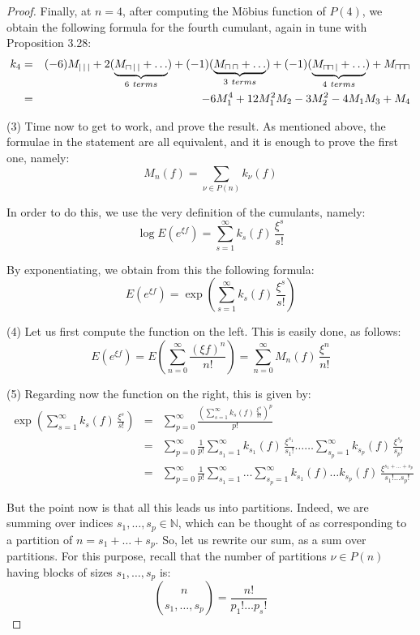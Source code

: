 \documentclass[12pt]{amsbook}
\begin{document}
\begin{proof}
Finally, at $n=4$, after computing the M\"obius function of $P(4)$, we obtain the following formula for the fourth cumulant, again in tune with Proposition 3.28:
\begin{eqnarray*}
k_4
&=&(-6)M_{|\,|\,|}+2(\underbrace{M_{\sqcap\,|\,|}+\ldots}_{6\ terms})+(-1)(\underbrace{M_{\sqcap\,\sqcap}+\ldots}_{3\ terms})+(-1)(\underbrace{M_{\sqcap\hskip-0.5mm\sqcap\,|}+\ldots}_{4\ terms})+M_{\sqcap\hskip-0.5mm\sqcap\hskip-0.5mm\sqcap}\\
&=&-6M_1^4+12M_1^2M_2-3M_2^2-4M_1M_3+M_4
\end{eqnarray*}

(3) Time now to get to work, and prove the result. As mentioned above, the formulae in the statement are all equivalent, and it is enough to prove the first one, namely:
$$M_n(f)=\sum_{\nu\in P(n)}k_\nu(f)$$

In order to do this, we use the very definition of the cumulants, namely:
$$\log E(e^{\xi f})=\sum_{s=1}^\infty k_s(f)\,\frac{\xi^s}{s!}$$

By exponentiating, we obtain from this the following formula:
$$E(e^{\xi f})=\exp\left(\sum_{s=1}^\infty k_s(f)\,\frac{\xi^s}{s!}\right)$$

(4) Let us first compute the function on the left. This is easily done, as follows:
$$E(e^{\xi f})
=E\left(\sum_{n=0}^\infty\frac{(\xi f)^n}{n!}\right)
=\sum_{n=0}^\infty M_n(f)\,\frac{\xi^n}{n!}$$

(5) Regarding now the function on the right, this is given by:
\begin{eqnarray*}
\exp\left(\sum_{s=1}^\infty k_s(f)\,\frac{\xi^s}{s!}\right)
&=&\sum_{p=0}^\infty\frac{\left(\sum_{s=1}^\infty k_s(f)\,\frac{\xi^s}{s!}\right)^p}{p!}\\
&=&\sum_{p=0}^\infty\frac{1}{p!}\sum_{s_1=1}^\infty k_{s_1}(f)\,\frac{\xi^{s_1}}{s_1!}\ldots\ldots\sum_{s_p=1}^\infty k_{s_p}(f)\,\frac{\xi^{s_p}}{s_p!}\\
&=&\sum_{p=0}^\infty\frac{1}{p!}\sum_{s_1=1}^\infty\ldots\sum_{s_p=1}^\infty k_{s_1}(f)\ldots k_{s_p}(f)\,\frac{\xi^{s_1+\ldots+s_p}}{s_1!\ldots s_p!}
\end{eqnarray*}

But the point now is that all this leads us into partitions. Indeed, we are summing over indices $s_1,\ldots,s_p\in\mathbb N$, which can be thought of as corresponding to a partition of $n=s_1+\ldots+s_p$. So, let us rewrite our sum, as a sum over partitions. For this purpose, recall that the number of partitions $\nu\in P(n)$ having blocks of sizes $s_1,\ldots,s_p$ is:
$$\binom{n}{s_1,\ldots,s_p}=\frac{n!}{p_1!\ldots p_s!}$$


\end{proof}
\end{document}

